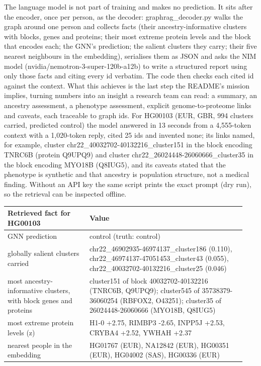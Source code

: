 \documentclass[11pt,a4paper]{article}
\begin{document}
The language model is not part of training and makes no prediction. It sits after the encoder, once per person, as the decoder: graphrag\_decoder.py walks the graph around one person and collects facts (their ancestry-informative clusters with blocks, genes and proteins; their most extreme protein levels and the block that encodes each; the GNN's prediction; the salient clusters they carry; their five nearest neighbours in the embedding), serialises them as JSON and asks the NIM model (nvidia/nemotron-3-super-120b-a12b) to write a structured report using only those facts and citing every id verbatim. The code then checks each cited id against the context. What this achieves is the last step the README's mission implies, turning numbers into an insight a research team can read: a summary, an ancestry assessment, a phenotype assessment, explicit genome-to-proteome links and caveats, each traceable to graph ids. For HG00103 (EUR, GBR, 994 clusters carried, predicted control) the model answered in 13 seconds from a 4,555-token context with a 1,020-token reply, cited 25 ids and invented none; its links named, for example, cluster chr22\_40032702-40132216\_cluster151 in the block encoding TNRC6B (protein Q9UPQ9) and cluster chr22\_26024448-26060666\_cluster35 in the block encoding MYO18B (Q8IUG5), and its caveats stated that the phenotype is synthetic and that ancestry is population structure, not a medical finding. Without an API key the same script prints the exact prompt (dry run), so the retrieval can be inspected offline.

\begin{longtable}{p{0.329\linewidth}p{0.611\linewidth}}
\toprule
\textbf{Retrieved fact for HG00103} & \textbf{Value} \\
\midrule
\endhead
GNN prediction & control (truth: control) \\
globally salient clusters carried & chr22\_46902935-46974137\_cluster186 (0.110), chr22\_46974137-47051453\_cluster43 (0.055), chr22\_40032702-40132216\_cluster25 (0.046) \\
most ancestry-informative clusters, with block genes and proteins & cluster151 of block 40032702-40132216 (TNRC6B, Q9UPQ9); cluster545 of 35738379-36060254 (RBFOX2, O43251); cluster35 of 26024448-26060666 (MYO18B, Q8IUG5) \\
most extreme protein levels (z) & H1-0 +2.75, RIMBP3 -2.65, INPP5J +2.53, CRYBA4 +2.52, YWHAH +2.37 \\
nearest people in the embedding & HG01767 (EUR), NA12842 (EUR), HG00351 (EUR), HG04002 (SAS), HG00336 (EUR) \\
\bottomrule
\end{longtable}
\end{document}
